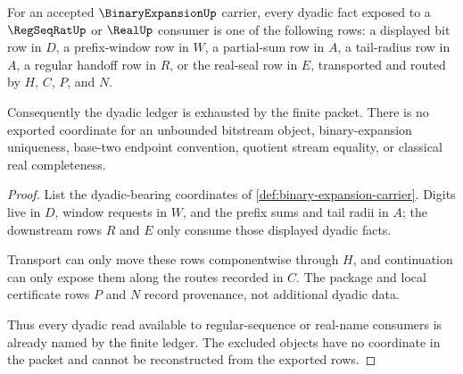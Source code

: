 \begin{theorem}
\label{thm:binary-expansion-dyadic-ledger-exhaustion}
For an accepted $\BinaryExpansionUp$ carrier, every dyadic fact exposed to a $\RegSeqRatUp$ or $\RealUp$ consumer is one of the following rows: a displayed bit row in $D$, a prefix-window row in $W$, a partial-sum row in $A$, a tail-radius row in $A$, a regular handoff row in $R$, or the real-seal row in $E$, transported and routed by $H$, $C$, $P$, and $N$.

Consequently the dyadic ledger is exhausted by the finite packet. There is no exported coordinate for an unbounded bitstream object, binary-expansion uniqueness, base-two endpoint convention, quotient stream equality, or classical real completeness.
\end{theorem}
\begin{proof}
List the dyadic-bearing coordinates of \autoref{def:binary-expansion-carrier}. Digits live in $D$, window requests in $W$, and the prefix sums and tail radii in $A$; the downstream rows $R$ and $E$ only consume those displayed dyadic facts.

Transport can only move these rows componentwise through $H$, and continuation can only expose them along the routes recorded in $C$. The package and local certificate rows $P$ and $N$ record provenance, not additional dyadic data.

Thus every dyadic read available to regular-sequence or real-name consumers is already named by the finite ledger. The excluded objects have no coordinate in the packet and cannot be reconstructed from the exported rows.
\end{proof}

